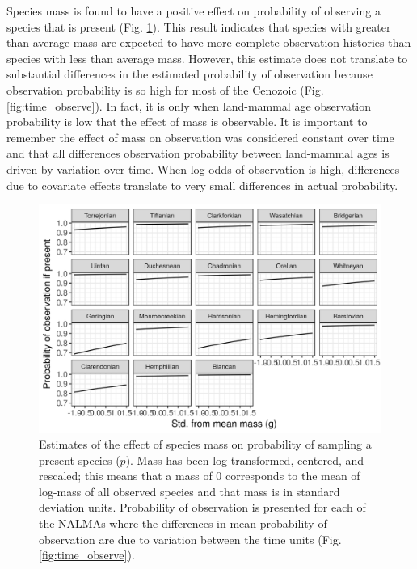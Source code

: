 \documentclass[12pt,letterpaper]{article}
\begin{document}
Species mass is found to have a positive effect on probability of observing a species that is present (Fig. \ref{fig:mass_observe}). This result indicates that species with greater than average mass are expected to have more complete observation histories than species with less than average mass. However, this estimate does not translate to substantial differences in the estimated probability of observation because observation probability is so high for most of the Cenozoic (Fig. \ref{fig:time_observe}). In fact, it is only when land-mammal age observation probability is low that the effect of mass is observable. It is important to remember the effect of mass on observation was considered constant over time and that all differences observation probability between land-mammal ages is driven by variation over time. When log-odds of observation is high, differences due to covariate effects translate to very small differences in actual probability.
\begin{figure}[ht]
  \includegraphics[width=\textwidth,height=0.4\textheight,keepaspectratio=true]{figure/mass_on_pres_bd}
  \caption[Estimates of the effect of mass on observation probability]{Estimates of the effect of species mass on probability of sampling a present species (\(p\)). Mass has been log-transformed, centered, and rescaled; this means that a mass of 0 corresponds to the mean of log-mass of all observed species and that mass is in standard deviation units. Probability of observation is presented for each of the NALMAs where the differences in mean probability of observation are due to variation between the time units (Fig. \ref{fig:time_observe}).}
  \label{fig:mass_observe}
\end{figure}
\end{document}

